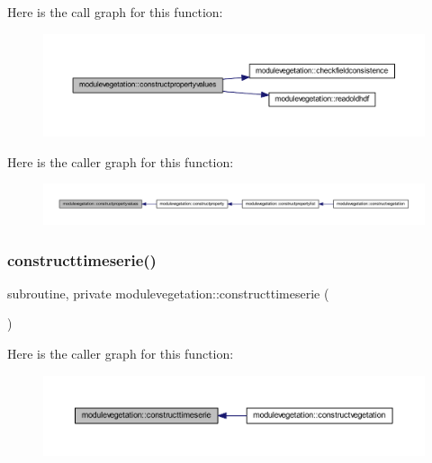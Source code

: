 Here is the call graph for this function\+:\nopagebreak
\begin{figure}[H]
\begin{center}
\leavevmode
\includegraphics[width=350pt]{namespacemodulevegetation_ad3fa17b279df119d651bb732e62a4f43_cgraph}
\end{center}
\end{figure}
Here is the caller graph for this function\+:\nopagebreak
\begin{figure}[H]
\begin{center}
\leavevmode
\includegraphics[width=350pt]{namespacemodulevegetation_ad3fa17b279df119d651bb732e62a4f43_icgraph}
\end{center}
\end{figure}
\mbox{\label{namespacemodulevegetation_ada5193380c49212dfdc1293861c924a0}} 
\subsubsection{\texorpdfstring{constructtimeserie()}{constructtimeserie()}}
{\footnotesize\ttfamily subroutine, private modulevegetation\+::constructtimeserie (\begin{DoxyParamCaption}{ }\end{DoxyParamCaption})\hspace{0.3cm}{\ttfamily [private]}}

Here is the caller graph for this function\+:\nopagebreak
\begin{figure}[H]
\begin{center}
\leavevmode
\includegraphics[width=350pt]{namespacemodulevegetation_ada5193380c49212dfdc1293861c924a0_icgraph}
\end{center}
\end{figure}
\mbox{\label{namespacemodulevegetation_ad61df3e43415a3c06f75588d06f77cce}} 
